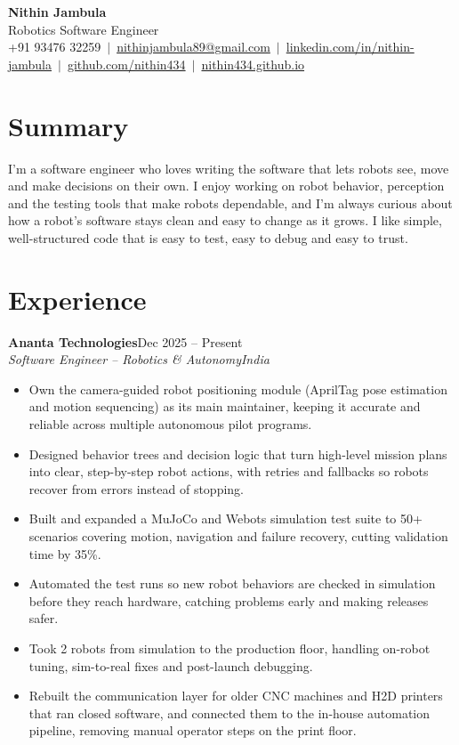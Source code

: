 \documentclass[a4paper,10pt]{article}
\newcommand{\job}[4]{\textbf{#1}\hfill #2\\\textit{#3}\hfill\textit{#4}\par\vspace{-2pt}}
\newcommand{\gap}{\vspace{5pt}}
\begin{document}
\begin{center}
  {\color{accent}\Huge\textbf{Nithin Jambula}}\\[3pt]
  {\large Robotics Software Engineer}\\[4pt]
  \small
  +91 93476 32259 \,$|$\,
  \href{mailto:nithinjambula89@gmail.com}{nithinjambula89@gmail.com} \,$|$\,
  \href{https://linkedin.com/in/nithin-jambula}{linkedin.com/in/nithin-jambula} \,$|$\,
  \href{https://github.com/nithin434}{github.com/nithin434} \,$|$\,
  \href{https://nithin434.github.io}{nithin434.github.io}
\end{center}

\section{Summary}
I'm a software engineer who loves writing the software that lets robots see, move and make decisions on their own.
I enjoy working on robot behavior, perception and the testing tools that make robots dependable, and I'm always curious about how a robot's software stays clean and easy to change as it grows.
I like simple, well-structured code that is easy to test, easy to debug and easy to trust.

\section{Experience}

\job{Ananta Technologies}{Dec 2025 -- Present}{Software Engineer -- Robotics \& Autonomy}{India}
\begin{itemize}
  \item Own the camera-guided robot positioning module (AprilTag pose estimation and motion sequencing) as its main maintainer, keeping it accurate and reliable across multiple autonomous pilot programs.
  \item Designed behavior trees and decision logic that turn high-level mission plans into clear, step-by-step robot actions, with retries and fallbacks so robots recover from errors instead of stopping.
  \item Built and expanded a MuJoCo and Webots simulation test suite to 50+ scenarios covering motion, navigation and failure recovery, cutting validation time by 35\%.
  \item Automated the test runs so new robot behaviors are checked in simulation before they reach hardware, catching problems early and making releases safer.
  \item Took 2 robots from simulation to the production floor, handling on-robot tuning, sim-to-real fixes and post-launch debugging.
  \item Rebuilt the communication layer for older CNC machines and H2D printers that ran closed software, and connected them to the in-house automation pipeline, removing manual operator steps on the print floor.
\end{itemize}
\gap
\end{document}
